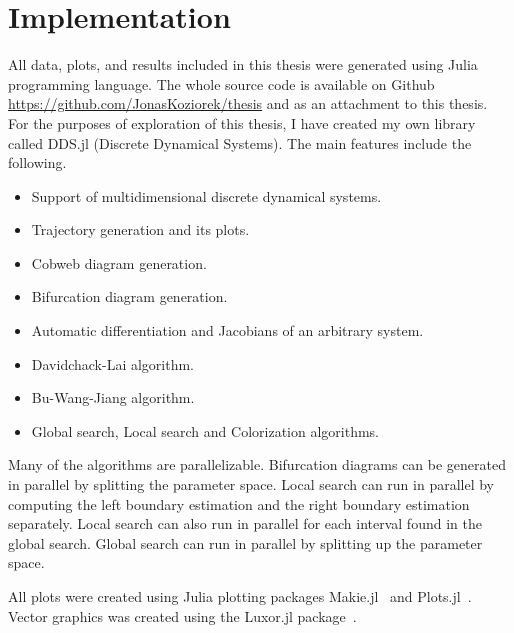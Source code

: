\section{Implementation}
All data, plots, and results included in this thesis were generated using Julia programming language.
The whole source code is available on Github \url{https://github.com/JonasKoziorek/thesis} and as an attachment to this thesis.
For the purposes of exploration of this thesis, I have created my own library called DDS.jl (Discrete Dynamical Systems).
The main features include the following.
\begin{itemize}
    \item Support of multidimensional discrete dynamical systems.
    \item Trajectory generation and its plots.
    \item Cobweb diagram generation.
    \item Bifurcation diagram generation.
    \item Automatic differentiation and Jacobians of an arbitrary system.
    \item Davidchack-Lai algorithm.
    \item Bu-Wang-Jiang algorithm.
    \item Global search, Local search and Colorization algorithms.
\end{itemize}
Many of the algorithms are parallelizable.
Bifurcation diagrams can be generated in parallel by splitting the parameter space.
Local search can run in parallel by computing the left boundary estimation and the right boundary estimation separately.
Local search can also run in parallel for each interval found in the global search.
Global search can run in parallel by splitting up the parameter space.
\par
All plots were created using Julia plotting packages Makie.jl~\cite{Danisch2021} and Plots.jl~\cite{Christ2022}.
Vector graphics was created using the Luxor.jl package~\cite{Luxor2024}.

\endinput